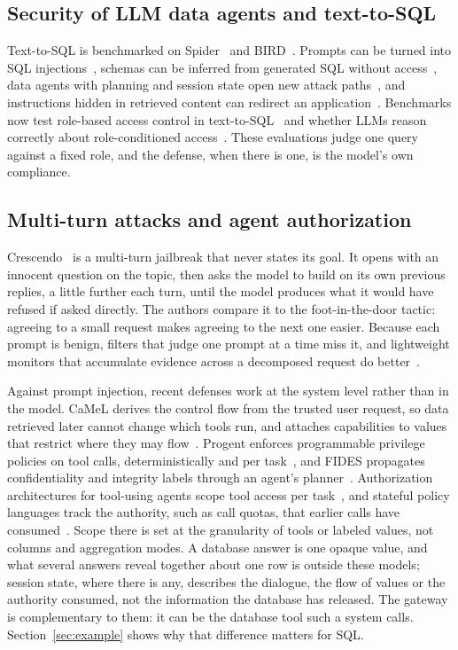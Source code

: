 \documentclass[10pt,journal,compsoc]{IEEEtran}
\begin{document}
\subsection{Security of LLM data agents and text-to-SQL}
Text-to-SQL is benchmarked on Spider~\cite{yu2018spider} and BIRD~\cite{li2023bird}. Prompts can be turned into SQL injections~\cite{pedro2025p2sql}, schemas can be inferred from generated SQL without access~\cite{klisura2025schema}, data agents with planning and session state open new attack paths~\cite{dataagents2026}, and instructions hidden in retrieved content can redirect an application~\cite{greshake2023indirect}. Benchmarks now test role-based access control in text-to-SQL~\cite{jiang2026rbacsql} and whether LLMs reason correctly about role-conditioned access~\cite{rolecond2025}. These evaluations judge one query against a fixed role, and the defense, when there is one, is the model's own compliance.

\subsection{Multi-turn attacks and agent authorization}
Crescendo~\cite{russinovich2025crescendo} is a multi-turn jailbreak that never states its goal. It opens with an innocent question on the topic, then asks the model to build on its own previous replies, a little further each turn, until the model produces what it would have refused if asked directly. The authors compare it to the foot-in-the-door tactic: agreeing to a small request makes agreeing to the next one easier. Because each prompt is benign, filters that judge one prompt at a time miss it, and lightweight monitors that accumulate evidence across a decomposed request do better~\cite{chen2025sequential}.

Against prompt injection, recent defenses work at the system level rather than in the model. CaMeL derives the control flow from the trusted user request, so data retrieved later cannot change which tools run, and attaches capabilities to values that restrict where they may flow~\cite{debenedetti2026camel}. Progent enforces programmable privilege policies on tool calls, deterministically and per task~\cite{shi2025progent}, and FIDES propagates confidentiality and integrity labels through an agent's planner~\cite{costa2025fides}. Authorization architectures for tool-using agents scope tool access per task~\cite{authz2026agents}, and stateful policy languages track the authority, such as call quotas, that earlier calls have consumed~\cite{agenra2026}. Scope there is set at the granularity of tools or labeled values, not columns and aggregation modes. A database answer is one opaque value, and what several answers reveal together about one row is outside these models; session state, where there is any, describes the dialogue, the flow of values or the authority consumed, not the information the database has released. The gateway is complementary to them: it can be the database tool such a system calls. Section~\ref{sec:example} shows why that difference matters for SQL.
\end{document}
